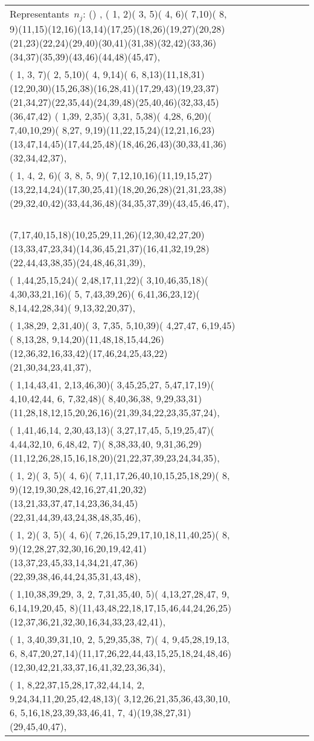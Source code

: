 \documentclass[border=10]{standalone}
\begin{document}
\begin{tabular}{@{}l@{}l@{}l@{}l@{}l@{}l@{}l@{}l@{}}
Representants\ $n_j$:  () , ( 1, 2)( 3, 5)( 4, 6)( 7,10)( 8, 9)(11,15)(12,16)(13,14)(17,25)(18,26)(19,27)(20,28)(21,23)(22,24)(29,40)(30,41)(31,38)(32,42)(33,36)(34,37)(35,39)(43,46)(44,48)(45,47),\ \\
( 1, 3, 7)( 2, 5,10)( 4, 9,14)( 6, 8,13)(11,18,31)(12,20,30)(15,26,38)(16,28,41)(17,29,43)(19,23,37)(21,34,27)(22,35,44)(24,39,48)(25,40,46)(32,33,45)(36,47,42)  ( 1,39, 2,35)( 3,31, 5,38)( 4,28, 6,20)( 7,40,10,29)( 8,27, 9,19)(11,22,15,24)(12,21,16,23)(13,47,14,45)(17,44,25,48)(18,46,26,43)(30,33,41,36)(32,34,42,37),\ \\
( 1, 4, 2, 6)( 3, 8, 5, 9)( 7,12,10,16)(11,19,15,27)(13,22,14,24)(17,30,25,41)(18,20,26,28)(21,31,23,38)(29,32,40,42)(33,44,36,48)(34,35,37,39)(43,45,46,47), \ \\
(7,17,40,15,18)(10,25,29,11,26)(12,30,42,27,20)(13,33,47,23,34)(14,36,45,21,37)(16,41,32,19,28)(22,44,43,38,35)(24,48,46,31,39), \ \\
( 1,44,25,15,24)( 2,48,17,11,22)( 3,10,46,35,18)( 4,30,33,21,16)( 5, 7,43,39,26)( 6,41,36,23,12)( 8,14,42,28,34)( 9,13,32,20,37), \ \\
( 1,38,29, 2,31,40)( 3, 7,35, 5,10,39)( 4,27,47, 6,19,45)( 8,13,28, 9,14,20)(11,48,18,15,44,26)(12,36,32,16,33,42)(17,46,24,25,43,22)(21,30,34,23,41,37), \ \\
( 1,14,43,41, 2,13,46,30)( 3,45,25,27, 5,47,17,19)( 4,10,42,44, 6, 7,32,48)( 8,40,36,38, 9,29,33,31)(11,28,18,12,15,20,26,16)(21,39,34,22,23,35,37,24), \ \\
( 1,41,46,14, 2,30,43,13)( 3,27,17,45, 5,19,25,47)( 4,44,32,10, 6,48,42, 7)( 8,38,33,40, 9,31,36,29)(11,12,26,28,15,16,18,20)(21,22,37,39,23,24,34,35), \ \\
( 1, 2)( 3, 5)( 4, 6)( 7,11,17,26,40,10,15,25,18,29)( 8, 9)(12,19,30,28,42,16,27,41,20,32)(13,21,33,37,47,14,23,36,34,45)(22,31,44,39,43,24,38,48,35,46), \ \\
( 1, 2)( 3, 5)( 4, 6)( 7,26,15,29,17,10,18,11,40,25)( 8, 9)(12,28,27,32,30,16,20,19,42,41)(13,37,23,45,33,14,34,21,47,36)(22,39,38,46,44,24,35,31,43,48), \ \\
( 1,10,38,39,29, 3, 2, 7,31,35,40, 5)( 4,13,27,28,47, 9, 6,14,19,20,45, 8)(11,43,48,22,18,17,15,46,44,24,26,25)(12,37,36,21,32,30,16,34,33,23,42,41), \ \\
( 1, 3,40,39,31,10, 2, 5,29,35,38, 7)( 4, 9,45,28,19,13, 6, 8,47,20,27,14)(11,17,26,22,44,43,15,25,18,24,48,46)(12,30,42,21,33,37,16,41,32,23,36,34), \ \\
( 1, 8,22,37,15,28,17,32,44,14, 2, 9,24,34,11,20,25,42,48,13)( 3,12,26,21,35,36,43,30,10, 6, 5,16,18,23,39,33,46,41, 7, 4)(19,38,27,31)(29,45,40,47), \ \\

\end{tabular}
\end{document}
